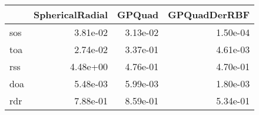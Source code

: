 \begin{tabular}{lrrr}
\toprule
{} &  SphericalRadial &   GPQuad &  GPQuadDerRBF \\
\midrule
sos &         3.81e-02 & 3.13e-02 &      1.50e-04 \\
toa &         2.74e-02 & 3.37e-01 &      4.61e-03 \\
rss &         4.48e+00 & 4.76e-01 &      4.70e-01 \\
doa &         5.48e-03 & 5.99e-03 &      1.80e-03 \\
rdr &         7.88e-01 & 8.59e-01 &      5.34e-01 \\
\bottomrule
\end{tabular}
